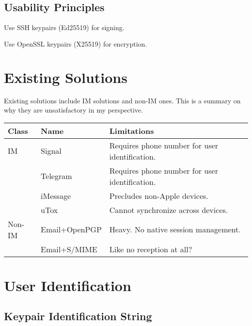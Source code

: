 \documentclass[a4paper,11pt]{article}
\begin{document}
\subsection{Usability Principles}

\begin{compactitem}
	\item Use SSH keypairs (Ed25519) for signing.
	\item Use OpenSSL keypairs (X25519) for encryption.
\end{compactitem}










\section{Existing Solutions}

Existing solutions include IM solutions and non-IM ones. This is a summary on why they are unsatisfactory in my perspective.

\begin{tabu}{|l|l|X|}
	\hline
	{Class}  & {Name}          & {Limitations}                                    \\
	\hline
	{IM}     & {Signal}        & {Requires phone number for user identification.} \\
	{ }      & {Telegram}      & {Requires phone number for user identification.} \\
	{ }      & {iMessage}      & {Precludes non-Apple devices.}                   \\
	{ }      & {uTox}          & {Cannot synchronize across devices.}             \\
	\hline
	{Non-IM} & {Email+OpenPGP} & {Heavy. No native session management.}           \\
	{ }      & {Email+S/MIME}  & {Like no reception at all?}                      \\
	\hline
\end{tabu}










\section{User Identification}

\subsection{Keypair Identification String}
\end{document}
